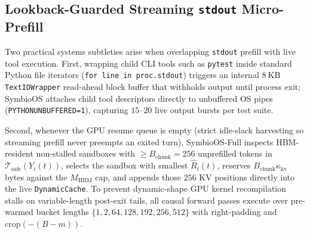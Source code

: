 \documentclass[10pt,journal,compsoc]{IEEEtran}
\theoremstyle{definition}
\theoremstyle{remark}
\newcommand{\SymbioOS}{\textup{\textsc{SymbioOS}}}
\newcommand{\SymbioFull}{\textup{\textsc{SymbioOS-Full}}}
\def\SymbioOS{SymbioOS}%
\def\SymbioFull{SymbioOS-Full}%
\begin{document}
\subsection{Lookback-Guarded Streaming \texttt{stdout} Micro-Prefill}
Two practical systems subtleties arise when overlapping \texttt{stdout} prefill with live tool execution. First, wrapping child CLI tools such as \texttt{pytest} inside standard Python file iterators (\texttt{for line in proc.stdout}) triggers an internal $8~\mathrm{KB}$ \texttt{TextIOWrapper} read-ahead block buffer that withholds output until process exit; \SymbioOS{} attaches child tool descriptors directly to unbuffered OS pipes (\texttt{PYTHONUNBUFFERED=1}), capturing $15$--$20$ live output bursts per test suite.

Second, whenever the GPU resume queue is empty (strict idle-slack harvesting so streaming prefill never preempts an exited turn), \SymbioFull{} inspects HBM-resident non-stalled sandboxes with $\ge B_{\mathrm{chunk}} = 256$ unprefilled tokens in $\mathcal{T}_{\mathrm{safe}}(Y_i(t))$, selects the sandbox with smallest $\hat{R}_i(t)$, reserves $B_{\mathrm{chunk}} \kappa_{\mathrm{kv}}$ bytes against the $M_{\mathrm{HBM}}$ cap, and appends those $256$ KV positions directly into the live \texttt{DynamicCache}. To prevent dynamic-shape GPU kernel recompilation stalls on variable-length post-exit tails, all causal forward passes execute over pre-warmed bucket lengths $\{1, 2, 64, 128, 192, 256, 512\}$ with right-padding and $\mathrm{crop}(-(B - m))$.
\end{document}
